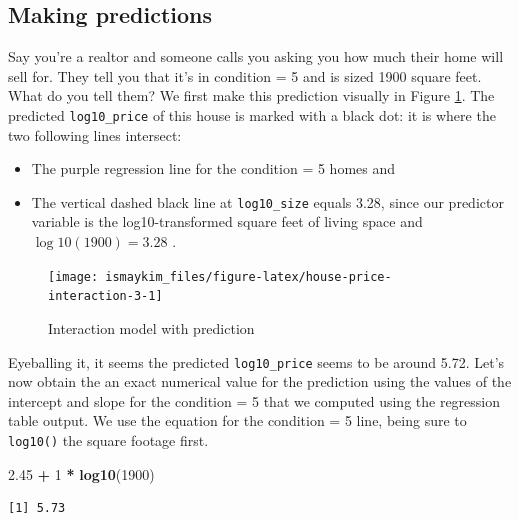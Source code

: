 \documentclass[12pt,]{krantz}
\makeatletter
\newenvironment{Shaded}{\begin{snugshade}}{\end{snugshade}}
\newcommand{\KeywordTok}[1]{\textcolor[rgb]{0.27,0.27,0.27}{\textbf{#1}}}
\newcommand{\DecValTok}[1]{\textcolor[rgb]{0.06,0.06,0.06}{#1}}
\newcommand{\FloatTok}[1]{\textcolor[rgb]{0.06,0.06,0.06}{#1}}
\newcommand{\StringTok}[1]{\textcolor[rgb]{0.5,0.5,0.5}{#1}}
\newcommand{\OperatorTok}[1]{\textcolor[rgb]{0.43,0.43,0.43}{\textbf{#1}}}
\newcommand{\NormalTok}[1]{#1}
\providecommand{\tightlist}{%
  \setlength{\itemsep}{0pt}\setlength{\parskip}{0pt}}
\newenvironment{kframe}{%
\medskip{}
\setlength{\fboxsep}{.8em}
 \def\at@end@of@kframe{}%
 \ifinner\ifhmode%
  \def\at@end@of@kframe{\end{minipage}}%
  \begin{minipage}{\columnwidth}%
 \fi\fi%
 \def\FrameCommand##1{\hskip\@totalleftmargin \hskip-\fboxsep
 \colorbox{shadecolor}{##1}\hskip-\fboxsep
     \hskip-\linewidth \hskip-\@totalleftmargin \hskip\columnwidth}%
 \MakeFramed {\advance\hsize-\width
   \@totalleftmargin\z@ \linewidth\hsize
   \@setminipage}}%
 {\par\unskip\endMakeFramed%
 \at@end@of@kframe}
\renewenvironment{Shaded}{\begin{kframe}}{\end{kframe}}
\makeatother
\begin{document}
\subsection{Making predictions}\label{house-prices-making-predictions}

Say you're a realtor and someone calls you asking you how much their
home will sell for. They tell you that it's in condition = 5 and is
sized 1900 square feet. What do you tell them? We first make this
prediction visually in Figure \ref{fig:house-price-interaction-3}. The
predicted \texttt{log10\_price} of this house is marked with a black
dot: it is where the two following lines intersect:

\begin{itemize}
\tightlist
\item
  The purple regression line for the condition = 5 homes and
\item
  The vertical dashed black line at \texttt{log10\_size} equals 3.28,
  since our predictor variable is the log10-transformed square feet of
  living space and \(\log10(1900) = 3.28\) .
\end{itemize}

\begin{figure}

{\centering \texttt{[image: ismaykim\_files/figure-latex/house-price-interaction-3-1]} 

}

\caption{Interaction model with prediction}\label{fig:house-price-interaction-3}
\end{figure}

Eyeballing it, it seems the predicted \texttt{log10\_price} seems to be
around 5.72. Let's now obtain the an exact numerical value for the
prediction using the values of the intercept and slope for the condition
= 5 that we computed using the regression table output. We use the
equation for the condition = 5 line, being sure to \texttt{log10()} the
square footage first.

\begin{Shaded}
\begin{Highlighting}[]
\FloatTok{2.45} \OperatorTok{+}\StringTok{ }\DecValTok{1} \OperatorTok{*}\StringTok{ }\KeywordTok{log10}\NormalTok{(}\DecValTok{1900}\NormalTok{)}
\end{Highlighting}
\end{Shaded}

\begin{verbatim}
[1] 5.73
\end{verbatim}
\end{document}
